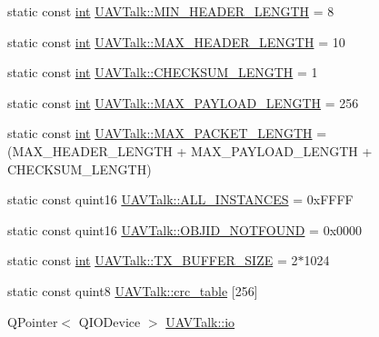 \begin{DoxyCompactItemize}
\item 
static const \hyperlink{ioapi_8h_a787fa3cf048117ba7123753c1e74fcd6}{int} \hyperlink{group___u_a_v_talk_plugin_ga0d20c7ff6e0eedb2ab1243c6bf957fd3}{U\-A\-V\-Talk\-::\-M\-I\-N\-\_\-\-H\-E\-A\-D\-E\-R\-\_\-\-L\-E\-N\-G\-T\-H} = 8
\item 
static const \hyperlink{ioapi_8h_a787fa3cf048117ba7123753c1e74fcd6}{int} \hyperlink{group___u_a_v_talk_plugin_ga279763a8abdcb2fae7cb36916b36c1a8}{U\-A\-V\-Talk\-::\-M\-A\-X\-\_\-\-H\-E\-A\-D\-E\-R\-\_\-\-L\-E\-N\-G\-T\-H} = 10
\item 
static const \hyperlink{ioapi_8h_a787fa3cf048117ba7123753c1e74fcd6}{int} \hyperlink{group___u_a_v_talk_plugin_ga094abac2d747f187a4b22bea1dd28ec0}{U\-A\-V\-Talk\-::\-C\-H\-E\-C\-K\-S\-U\-M\-\_\-\-L\-E\-N\-G\-T\-H} = 1
\item 
static const \hyperlink{ioapi_8h_a787fa3cf048117ba7123753c1e74fcd6}{int} \hyperlink{group___u_a_v_talk_plugin_gac89ca6073b8cf1479a5e2468b3691db9}{U\-A\-V\-Talk\-::\-M\-A\-X\-\_\-\-P\-A\-Y\-L\-O\-A\-D\-\_\-\-L\-E\-N\-G\-T\-H} = 256
\item 
static const \hyperlink{ioapi_8h_a787fa3cf048117ba7123753c1e74fcd6}{int} \hyperlink{group___u_a_v_talk_plugin_gab5a37286c5e8b676d49e134f26444a0c}{U\-A\-V\-Talk\-::\-M\-A\-X\-\_\-\-P\-A\-C\-K\-E\-T\-\_\-\-L\-E\-N\-G\-T\-H} = (M\-A\-X\-\_\-\-H\-E\-A\-D\-E\-R\-\_\-\-L\-E\-N\-G\-T\-H + M\-A\-X\-\_\-\-P\-A\-Y\-L\-O\-A\-D\-\_\-\-L\-E\-N\-G\-T\-H + C\-H\-E\-C\-K\-S\-U\-M\-\_\-\-L\-E\-N\-G\-T\-H)
\item 
static const quint16 \hyperlink{group___u_a_v_talk_plugin_ga71e922ea4fa7f9e0a9fe89ebdd2fe75c}{U\-A\-V\-Talk\-::\-A\-L\-L\-\_\-\-I\-N\-S\-T\-A\-N\-C\-E\-S} = 0x\-F\-F\-F\-F
\item 
static const quint16 \hyperlink{group___u_a_v_talk_plugin_gaa627c86aec4d382c9744541688fb66ef}{U\-A\-V\-Talk\-::\-O\-B\-J\-I\-D\-\_\-\-N\-O\-T\-F\-O\-U\-N\-D} = 0x0000
\item 
static const \hyperlink{ioapi_8h_a787fa3cf048117ba7123753c1e74fcd6}{int} \hyperlink{group___u_a_v_talk_plugin_gaa84c0f2f2a83872a6f82f00969d9ddff}{U\-A\-V\-Talk\-::\-T\-X\-\_\-\-B\-U\-F\-F\-E\-R\-\_\-\-S\-I\-Z\-E} = 2$\ast$1024
\item 
static const quint8 \hyperlink{group___u_a_v_talk_plugin_gac5c5c810a2edb31ed325bf2d54e1b289}{U\-A\-V\-Talk\-::crc\-\_\-table} \mbox{[}256\mbox{]}
\item 
Q\-Pointer$<$ Q\-I\-O\-Device $>$ \hyperlink{group___u_a_v_talk_plugin_ga0047f38af98ba4de8e38500e10b73046}{U\-A\-V\-Talk\-::io}

\end{DoxyCompactItemize}
